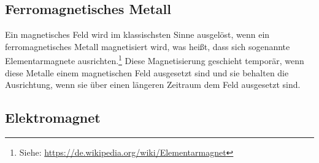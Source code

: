 




%
%	





\subsection{Ferromagnetisches Metall}

Ein magnetisches Feld wird im klassischsten Sinne ausgelöst, wenn ein ferromagnetisches Metall \glqq magnetisiert\grqq{} wird, was heißt, dass sich sogenannte Elementarmagnete ausrichten.\footnote{Siehe: \url{https://de.wikipedia.org/wiki/Elementarmagnet}} Diese Magnetisierung geschieht temporär, wenn diese Metalle einem magnetischen Feld ausgesetzt sind und sie behalten die Ausrichtung, wenn sie über einen längeren Zeitraum dem Feld ausgesetzt sind.


\subsection{Elektromagnet}

